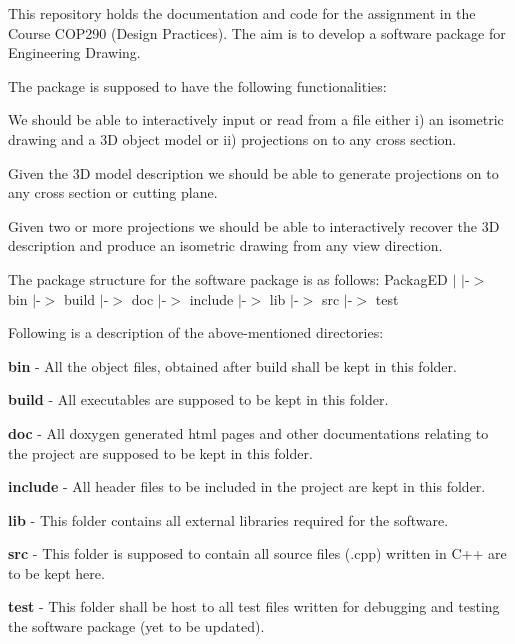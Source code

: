 This repository holds the documentation and code for the assignment in the Course C\+O\+P290 (Design Practices). The aim is to develop a software package for Engineering Drawing.

The package is supposed to have the following functionalities\+:
\begin{DoxyEnumerate}
\item We should be able to interactively input or read from a file either i) an isometric drawing and a 3D object model or ii) projections on to any cross section.
\item Given the 3D model description we should be able to generate projections on to any cross section or cutting plane.
\item Given two or more projections we should be able to interactively recover the 3D description and produce an isometric drawing from any view direction.
\end{DoxyEnumerate}

The package structure for the software package is as follows\+: Packag\+ED $\vert$ $\vert$-\/$>$ bin $\vert$-\/$>$ build $\vert$-\/$>$ doc $\vert$-\/$>$ include $\vert$-\/$>$ lib $\vert$-\/$>$ src $\vert$-\/$>$ test

Following is a description of the above-\/mentioned directories\+:
\begin{DoxyEnumerate}
\item {\bfseries bin} -\/ All the object files, obtained after build shall be kept in this folder.
\item {\bfseries build} -\/ All executables are supposed to be kept in this folder.
\item {\bfseries doc} -\/ All doxygen generated html pages and other documentations relating to the project are supposed to be kept in this folder.
\item {\bfseries include} -\/ All header files to be included in the project are kept in this folder.
\item {\bfseries lib} -\/ This folder contains all external libraries required for the software.
\item {\bfseries src} -\/ This folder is supposed to contain all source files (.cpp) written in C++ are to be kept here.
\item {\bfseries test} -\/ This folder shall be host to all test files written for debugging and testing the software package (yet to be updated). 
\end{DoxyEnumerate}
